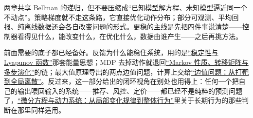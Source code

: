 两章共享 Bellman 的递归，但不要压缩成``已知模型解方程、未知模型逼近同一个不动点''。策略梯度就不走这条路，它直接优化动作分布；部分可观测、平均回报、纯离线数据还会各自改变问题的形式。更稳的主线是先把四件事说清楚——控制器看得见什么，能改变什么，在优化什么，数据由谁产生——之后再挑方法。

前面需要的底子都已经备好。反馈为什么能稳住系统，用的是\hyperref[sec:15-Differential-Equations-and-Dynamical-Systems/02-Stability-and-Dynamical-Systems/02]{``稳定性与 Lyapunov 函数''}那套能量思想；MDP 去掉动作就退回\hyperref[sec:06-Random-Processes/03-Markov-Chains/01]{``Markov 性质、转移矩阵与多步演化''}的链；最大值原理导出的两点边值问题，计算上交给\hyperref[sec:08-Numerical-Analysis/06-ODE/04]{``边值问题：从打靶到全局离散''}。反过来，这一部分给出的闭环视角在别处也用得上：任何一个把自己的输出喂回输入的系统——推荐、风控、定价——都已经不是纯粹的预测问题了，\hyperref[ch:133]{``微分方程与动力系统：从局部变化规律到整体行为''}里关于长期行为的那些判断在那里同样适用。
